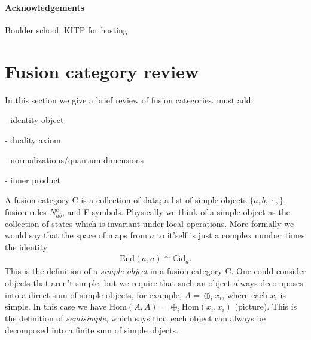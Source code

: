 \documentclass[12pt,a4paper]{article}
\begin{document}
 \paragraph{Acknowledgements}
 Boulder school, KITP for hosting
 
 

{}




\clearpage
\appendix
\section{Fusion category review}
In this section we give a brief review of fusion categories. 
must add:

- identity object

- duality axiom

- normalizations/quantum dimensions

- inner product

A fusion category {\cal C} is a collection of data; a list of simple objects $\{a, b, \cdots, \}$, fusion rules $N_{ab}^c$, and F-symbols. 
Physically we think of a simple object as the collection of states which is invariant under local operations. 
More formally we would say that the space of maps from $a$ to it'self is just a complex number times the identity\begin{align}
\text{End}(a,a) \cong \mathbb{C} \text{id}_a.
\end{align}
This is the definition of a {\em simple object} in a fusion category {\cal C}. 
One could consider objects that aren't simple, but we require that such an object always decomposes into a direct sum of simple objects, for example, $A = \oplus_i x_i$, where each $x_i$ is simple. 
In this case we have $\text{Hom}(A,A)= \oplus_i \text{Hom}(x_i,x_i)$ (picture). 
This is the definition of {\em semisimple}, which says that each object can always be decomposed into a finite sum of simple objects.
\end{document}
